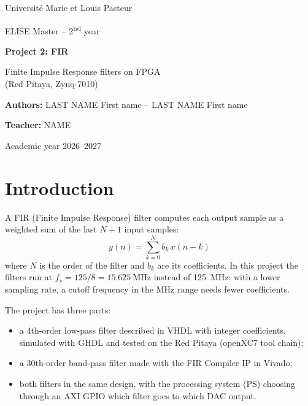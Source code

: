 \documentclass[11pt,a4paper]{article}
\renewcommand{\_}{\oldunderscore\allowbreak}
\begin{document}
\begin{titlepage}
  \centering
  {\large Université Marie et Louis Pasteur\par}
  {\large ELISE Master -- 2\textsuperscript{nd} year\par}
  \vspace{3cm}
  {\Huge\bfseries Project 2: FIR\par}
  \vspace{0.5cm}
  {\Large Finite Impulse Response filters on FPGA\\(Red Pitaya, Zynq-7010)\par}
  \vspace{3cm}
  {\large \textbf{Authors:} LAST NAME First name -- LAST NAME First name\par}
  \vspace{0.5cm}
  {\large \textbf{Teacher:} NAME\par}
  \vfill
  {\large Academic year 2026--2027\par}
\end{titlepage}

\tableofcontents
\newpage

\section{Introduction}
A FIR (Finite Impulse Response) filter computes each output sample as a
weighted sum of the last $N+1$ input samples:
\[
y(n) = \sum_{k=0}^{N} b_k\,x(n-k)
\]
where $N$ is the order of the filter and $b_k$ are its coefficients. In this
project the filters run at $f_s = 125/8 = \SI{15.625}{\mega\hertz}$ instead of
\SI{125}{\mega\hertz}: with a lower sampling rate, a cutoff frequency in the MHz
range needs fewer coefficients.

The project has three parts:
\begin{itemize}
  \item a 4th-order low-pass filter described in VHDL with integer
        coefficients, simulated with GHDL and tested on the Red Pitaya
        (openXC7 tool chain);
  \item a 30th-order band-pass filter made with the FIR Compiler IP in Vivado;
  \item both filters in the same design, with the processing system (PS)
        choosing through an AXI GPIO which filter goes to which DAC output.
\end{itemize}
\end{document}
